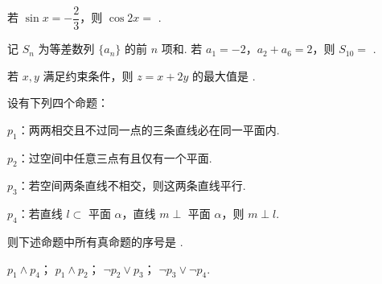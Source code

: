\documentclass[a4paper,11pt]{report}
\begin{document}
\begin{examquestions}[start=13]

\item 若 $\sin x=-\dfrac23$，则 $\cos2x=$ \blank.
\vspace{-0.3em}

\item 记 $S_n$ 为等差数列 $\{a_n\}$ 的前 $n$ 项和. 若 $a_1=-2$，$a_2+a_6=2$，则 $S_{10}=$ \blank.
\vspace{-0.3em}

\item 若 $x,y$ 满足约束条件，则 $z=x+2y$ 的最大值是 \blank.
\vspace{-0.3em}
\item 设有下列四个命题：

$p_1$：两两相交且不过同一点的三条直线必在同一平面内. 

$p_2$：过空间中任意三点有且仅有一个平面. 

$p_3$：若空间两条直线不相交，则这两条直线平行. 

$p_4$：若直线 $l\subset$ 平面 $\alpha$，直线 $m\perp$ 平面 $\alpha$，则 $m\perp l$. 

则下述命题中所有真命题的序号是 \blank.

 $p_1\wedge p_4$； $p_1\wedge p_2$； $\neg p_2\vee p_3$； $\neg p_3\vee\neg p_4$.

\end{examquestions}
\vspace{-1.3em}
\end{document}
